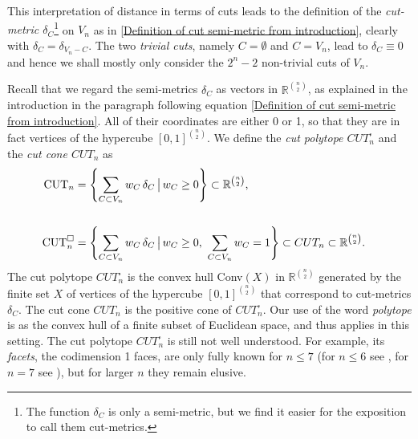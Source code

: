 \documentclass[12pt]{amsart}
\numberwithin{theorem}{section}
\theoremstyle{remark}
\begin{document}
This interpretation of distance in terms of cuts leads to the definition of the {\em cut-metric $\delta_C$}\footnote{The function $\delta_C$ is only a semi-metric, but we find it easier for the exposition to call them cut-metrics.} on $V_n$ as in \eqref{Definition of cut semi-metric from introduction}, clearly with $\delta_C = \delta_{V_n-C}$. The two {\em trivial cuts}, namely $C=\emptyset$ and $C=V_n$, lead to $\delta_C\equiv 0$ and hence we shall mostly only consider the $2^{n}-2$ non-trivial cuts of $V_n$. 

Recall that we regard the semi-metrics $\delta_C$ as vectors in $\mathbb R^{n\choose 2}$, as explained in the introduction in the paragraph following equation \eqref{Definition of cut semi-metric from introduction}. All of their coordinates are either 0 or 1, so that they are in fact vertices of the hypercube $[0,1]^{n\choose 2}$. We define the  {\em cut polytope $CUT_n^\square$} and the {\em cut cone $CUT_n$} as 
\begin{align}
\text{CUT}_n & = \left\{ \sum_{C\subset V_n} w_C \, \delta_C \,\big|\, w_C\ge 0\right\} \subset \mathbb R^{n\choose 2}, \cr  
& \cr 
\text{CUT}_n^\square & = \left\{ \sum_{C\subset V_n} w_C \, \delta_C \,\big|\, w_C\ge 0, \,\, \sum _{C\subset V_n} w_C = 1\right\} \subset CUT_n \subset \mathbb R^{n\choose 2}.  	
\end{align}  
The cut polytope $CUT^\square_n$ is the convex hull Conv$(X)$ in $\mathbb R^{n\choose 2}$ generated by the finite set $X$ of vertices of the hypercube $[0,1]^{n\choose 2}$ that correspond to cut-metrics $\delta_C$. The cut cone $CUT_n$ is the positive cone of $CUT^\square _n$. Our use of the word {\em polytope} is as the convex hull of a finite subset of Euclidean space, and thus applies in this setting. The cut polytope $CUT_n^\square$ is still not well understood. For example, its {\em facets}, the codimension 1 faces, are only fully known for $n\le 7$ (for $n\le 6$ see \cite{DezaLaurant1}, for $n=7$ see \cite{Grishukhin}), but for larger $n$ they remain elusive. 
\end{document}
